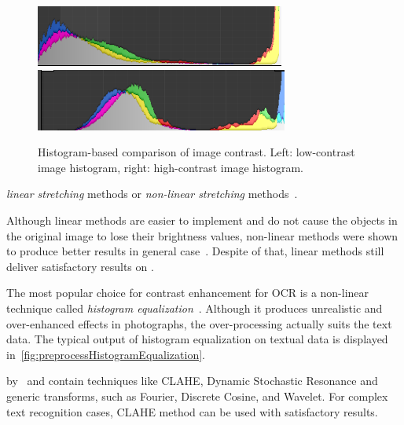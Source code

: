 \begin{figure}[t]
\centering
\includegraphics[width=0.4\linewidth]{img/preprocessing//histogram_low.png}
\qquad
\includegraphics[width=0.4\linewidth]{img/preprocessing/histogram_high.png}
\caption{Histogram-based comparison of image contrast. Left: low-contrast image histogram, right: high-contrast image histogram. }
\label{fig:preprocessContrastComparison}
\end{figure}

 \emph{linear stretching} methods or \emph{non-linear stretching} methods~\citep{linearNonStretch}.

 Although linear methods are easier to implement and do not cause the objects in the original image to lose their brightness values, non-linear methods were shown to produce better results in general case~\citep{chandpa1comparative}. Despite of that, linear methods still deliver satisfactory results on .

The most popular choice for contrast enhancement for OCR is a non-linear technique called \emph{histogram equalization}~\citep{histogramEQ}.  Although it produces unrealistic and over-enhanced effects in photographs, the over-processing actually suits the text data. The typical output of histogram equalization on textual data is displayed in~\cref{fig:preprocessHistogramEqualization}.

  by~\citet{contrastOther} and contain techniques like CLAHE, Dynamic Stochastic Resonance and generic transforms, such as Fourier, Discrete Cosine, and Wavelet. For complex text recognition cases, CLAHE method can be used with satisfactory results.

